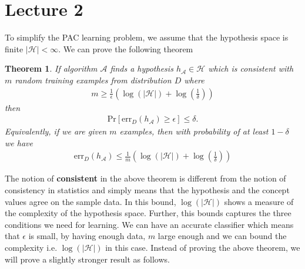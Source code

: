 \documentclass[10pt ]{article}
\newtheorem{thm}{Theorem}
\begin{document}
\section*{Lecture 2}
To simplify the PAC learning problem, we assume that the hypothesis space is finite $|\mathcal{H}| < \infty$. We can prove the following theorem
\begin{thm}
{\em 
If algorithm $\mathcal{A}$ finds a hypothesis $h_{\mathcal{A}} \in \mathcal{H}$ which is consistent with $m$ random training examples from distribution $D$ where 
\begin{align}
m \ge \frac{1}{\epsilon} \left( \log(|\mathcal{H}|) + \log(\frac{1}{
\delta})\right)
\end{align}
then 
\begin{align}
\mathrm{Pr} \left[ \mathrm{err}_D(h_{\mathcal{A}}) \ge \epsilon\right] \le \delta.
\end{align}
Equivalently, if we are given $m$ examples, then with probability of at least $1-\delta$ we have 
\begin{align}
\mathrm{err}_D(h_{\mathcal{A}}) \le \frac{1}{m} \left( \log(|\mathcal{H}|) + \log(\frac{1}{
\delta})\right)
\end{align}
}
\label{thm_pac_finite_1}
\end{thm}

The notion of \textbf{consistent} in the above theorem is different from the notion of consistency in statistics and simply means that the hypothesis and the concept values agree on the sample data.
In this bound, $ \log(|\mathcal{H}|) $ shows a measure of the complexity of the hypothesis space.  Further, this bounds captures the three conditions we need for learning. We can have an accurate classifier which means that $\epsilon$ is small, by having enough data, $m$ large enough and we can bound the complexity i.e. $\log(|\mathcal{H}|)$ in this case. Instead of proving the above theorem, we will prove a slightly stronger result as follows.
\end{document}
